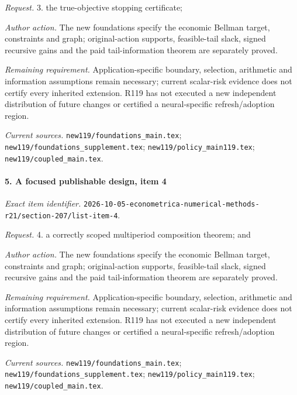 \par\emph{Request.} 3. the true-objective stopping certificate;

\par\emph{Author action.} The new foundations specify the economic Bellman target, constraints and graph; original-action supports, feasible-tail slack, signed recursive gains and the paid tail-information theorem are separately proved.

\par\emph{Remaining requirement.} Application-specific boundary, selection, arithmetic and information assumptions remain necessary; current scalar-risk evidence does not certify every inherited extension. R119 has not executed a new independent distribution of future changes or certified a neural-specific refresh/\allowbreak{}adoption region.

\par\emph{Current sources.} \nolinkurl{new119/foundations_main.tex}; \nolinkurl{new119/foundations_supplement.tex}; \nolinkurl{new119/policy_main119.tex}; \nolinkurl{new119/coupled_main.tex}.

\paragraph{5. A focused publishable design, item 4}

\emph{Exact item identifier.} \nolinkurl{2026-10-05-econometrica-numerical-methods-r21/section-207/list-item-4}.

\par\emph{Request.} 4. a correctly scoped multiperiod composition theorem; and

\par\emph{Author action.} The new foundations specify the economic Bellman target, constraints and graph; original-action supports, feasible-tail slack, signed recursive gains and the paid tail-information theorem are separately proved.

\par\emph{Remaining requirement.} Application-specific boundary, selection, arithmetic and information assumptions remain necessary; current scalar-risk evidence does not certify every inherited extension. R119 has not executed a new independent distribution of future changes or certified a neural-specific refresh/\allowbreak{}adoption region.

\par\emph{Current sources.} \nolinkurl{new119/foundations_main.tex}; \nolinkurl{new119/foundations_supplement.tex}; \nolinkurl{new119/policy_main119.tex}; \nolinkurl{new119/coupled_main.tex}.

